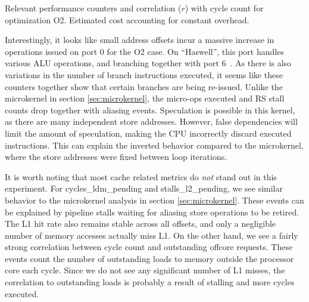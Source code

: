 \documentclass[10pt, conference, compsocconf]{IEEEtran}
\newcommand{\perfctr}[1] {
  {\lowercase{#1}}
}
\begin{document}
\begin{table*}[t]
  \centering
  \caption{Relevant performance counters and correlation ($r$) with cycle count for optimization O2. Estimated cost accounting for constant overhead.\label{tab:convstats}}{
    \pgfplotstabletypeset[
      int detect, %
      col sep=comma,
      columns={Performance counter, Correlation, 0, 2, 4, 8},
      column type=r,
      columns/Performance counter/.style={
        string type, 
        column type=l,
        column type/.add={|}{},
        postproc cell content/.append code={
          \pgfkeysalso{@cell content=\perfctr{##1}}
        }
      },
      columns/Correlation/.style={
        fixed,
        fixed zerofill,
        precision=2
      },
      every head row/.style={
        output empty row,
        before row={\hline
          Performance counter & $r$ & 0 & 2 & 4 & 8 \\
        },
        after row=\hline\hline
      },
      every last row/.style={after row=\hline},
      every last column/.style={column type/.add={}{|}}
    ]{bin/conv-default-o2-haswell.estimate.csv}
  }
\end{table*}

Interestingly, it looks like small address offsets incur a massive increase in operations issued on port 0 for the O2 case.
On ``Haswell'', this port handles various ALU operations, and branching together with port 6~\cite[Figure 2.1]{OptimizationManual}.
As there is also variations in the number of branch instructions executed, it seems like these counters together show that certain branches are being re-issued.
Unlike the microkernel in section \ref{sec:microkernel}, the micro-ops executed and RS stall counts drop together with aliasing events.
Speculation is possible in this kernel, as there are many independent store addresses.
However, false dependencies will limit the amount of speculation, making the CPU incorrectly discard executed instructions.
This can explain the inverted behavior compared to the microkernel, where the store addresses were fixed between loop iterations.

It is worth noting that most cache related metrics do \emph{not} stand out in this experiment.
For cycles\_ldm\_pending and stalls\_l2\_pending, we see similar behavior to the microkernel analysis in section \ref{sec:microkernel}.
These events can be explained by pipeline stalls waiting for aliasing store operations to be retired.
The L1 hit rate also remains stable across all offsets, and only a negligible number of memory accesses actually miss L1.
On the other hand, we see a fairly strong correlation between cycle count and outstanding offcore requests. 
These events count the number of outstanding loads to memory outside the processor core each cycle.
Since we do not see any significant number of L1 misses, the correlation to outstanding loads is probably a result of stalling and more cycles executed.
\end{document}

